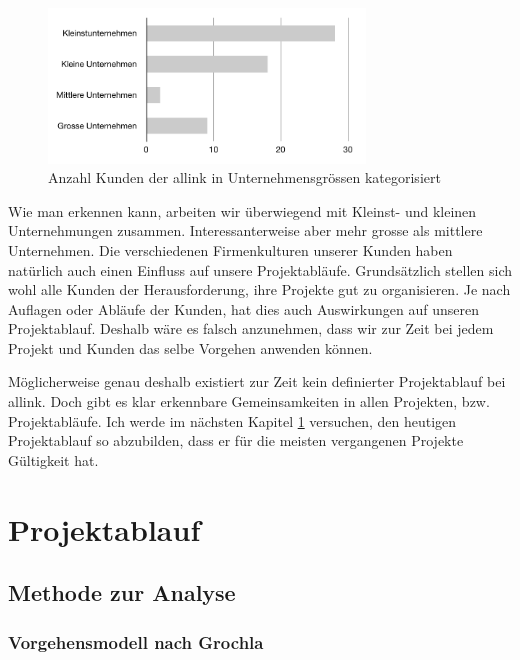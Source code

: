 \begin{figure}[htbp]
\begin{center}
\includegraphics[width=0.75\textwidth,angle=0]{./bilder/analyse/kundenkategorisierung.pdf}
\caption{Anzahl Kunden der allink in Unternehmensgrössen kategorisiert}
\label{pic:kundenkategorisierung}
\end{center}
\end{figure}

Wie man erkennen kann, arbeiten wir überwiegend mit Kleinst- und kleinen 
Unternehmungen zusammen. Interessanterweise aber mehr grosse als mittlere
Unternehmen.
Die verschiedenen Firmenkulturen unserer Kunden haben natürlich auch einen Einfluss 
auf unsere Projektabläufe. Grundsätzlich stellen sich wohl alle Kunden
der Herausforderung, ihre Projekte gut zu organisieren. Je nach Auflagen oder
Abläufe der Kunden, hat dies auch Auswirkungen auf unseren Projektablauf.
Deshalb wäre es falsch anzunehmen, dass wir zur Zeit bei jedem Projekt und 
Kunden das selbe Vorgehen anwenden können.

Möglicherweise genau deshalb existiert zur Zeit kein definierter Projektablauf
bei allink. Doch gibt es klar erkennbare Gemeinsamkeiten in allen Projekten,
bzw. Projektabläufe. Ich werde im nächsten Kapitel \ref{chap:projektablauf} 
versuchen, den heutigen Projektablauf so abzubilden, dass er für die meisten
vergangenen Projekte Gültigkeit hat.

\section{Projektablauf}\label{chap:projektablauf}

\subsection{Methode zur Analyse}
\subsubsection{Vorgehensmodell nach Grochla}


